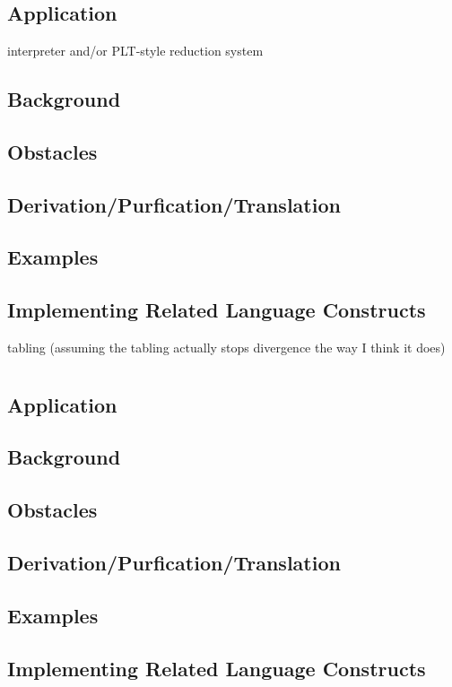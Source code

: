 \chapter{}
\section{Application}
interpreter and/or PLT-style reduction system
\section{Background}
\section{Obstacles}
\section{Derivation/Purfication/Translation}
\section{Examples}
\section{Implementing Related Language Constructs}
tabling (assuming the tabling actually stops divergence the way I think it does)

\chapter{}
\section{Application}
\section{Background}
\section{Obstacles}
\section{Derivation/Purfication/Translation}
\section{Examples}
\section{Implementing Related Language Constructs}

